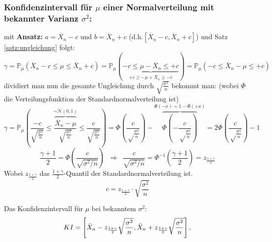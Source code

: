 \subsubsection{Konfidenzintervall für $\mu$ einer Normalverteilung mit bekannter Varianz $\sigma^2$:}
mit \textbf{Ansatz:} $a=\overline X_n-c$ und $b=\overline X_n+c$ (d.h.$[\overline X_n-c, \overline X_n+c]$) und Satz \ref{satz:ungleichung} folgt:
\[\gamma=\mathbb{P}_\mu(\overline X_n-c\leq\mu\leq\overline X_n+c)=
\mathbb{P}_\mu(\underbrace{-c\leq\mu-\overline X_n\leq+c}_{+c\geq-\mu+\overline X_n\geq-c})=
\mathbb{P}_\mu(-c\leq\overline X_n-\mu\leq+c)\]
dividiert man nun die gesamte Ungleichung durch $\sqrt{\frac{\sigma^2}{n}}$ bekommt man: (wobei $\Phi$ die Verteilungsfunktion der Standardnormalverteilung ist)
\[\gamma=\mathbb{P}_\mu\left(\frac{-c}{\sqrt{\frac{\sigma^2}{n}}}\leq\overbrace{\frac{\overline X_n-\mu}{\sqrt{\frac{\sigma^2}{n}}}}^{\sim\mathcal{N}(0,1)}\leq\frac{c}{\sqrt{\frac{\sigma^2}{n}}}\right)=
\Phi\left(\frac{c}{\sqrt\frac{\sigma^2}{n}}\right)-\overbrace{\Phi\left(-\frac{c}{\sqrt\frac{\sigma^2}{n}}\right)}^{\Phi(-x)=1-\Phi(+x)}=
2\Phi\left(\frac{c}{\sqrt\frac{\sigma^2}{n}}\right)-1\]
\[\frac{\gamma+1}{2}=\Phi\left(\frac{c}{\sqrt{\sigma^2/n}}\right)\;\;\Rightarrow
\;\;\frac{c}{\sqrt{\sigma^2/n}}=\Phi^{-1}\left(\frac{\gamma+1}{2}\right)=z_{\frac{1+\gamma}{2}}\]
Wobei $z_{\frac{1+\gamma}{2}}$ das $\frac{1+\gamma}{2}$-Quantil der Standardnormalverteilung ist.
\[c=z_{\frac{1+\gamma}{2}}\cdot \sqrt{\frac{\sigma^2}{n}}\]
\begin{definition}\label{def:ki_bekannter_varianz}
Das Konfidenzintervall für $\mu$ bei bekanntem $\sigma^2$:
\[KI=\left[\bar X_n-z_{\frac{1+\gamma}{2}}\sqrt{\sigma^2\over n},
\bar X_n+z_{\frac{1+\gamma}{2}}\sqrt{\sigma^2\over n}\right],\]
\end{definition}

